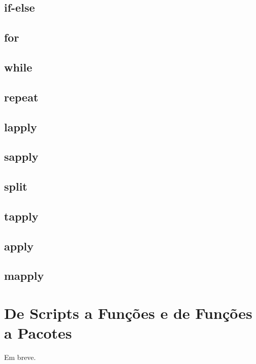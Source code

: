 \documentclass[]{book}
\theoremstyle{definition}
\theoremstyle{definition}
\theoremstyle{definition}
\theoremstyle{remark}
\begin{document}
\section{if-else}\label{if-else}

\section{for}\label{for}

\section{while}\label{while}

\section{repeat}\label{repeat}

\section{lapply}\label{lapply}

\section{sapply}\label{sapply}

\section{split}\label{split}

\section{tapply}\label{tapply}

\section{apply}\label{apply}

\section{mapply}\label{mapply}

\chapter{De Scripts a Funções e de Funções a Pacotes}\label{fx}

Em breve.
\end{document}
